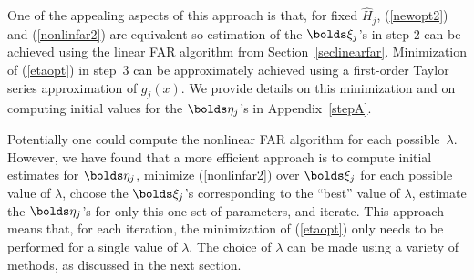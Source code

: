 \documentclass[aos,MSNbibl,dvips]{arximspdf}
\newcommand{\btheta}{\bolds\theta}
\newcommand{\bfeta}{\bolds\eta}
\newcommand{\bxi}{\bolds\xi}
\newcommand{\bh}{{\mathbf h}}
\newcommand{\hbfeta}{\hat{\bfeta}}
\newcommand{\hbxi}{\hat{\bxi}}
\begin{document}
One of the appealing aspects of this approach is that, for fixed $\widehat
H_j$, (\ref{newopt2}) and (\ref{nonlinfar2}) are equivalent so
estimation of the $\bxi_j$'s in step 2 can be achieved using the
linear FAR algorithm from Section~\ref{seclinearfar}. Minimization of
(\ref{etaopt}) in step~3 can be approximately achieved using a
first-order Taylor series approximation of $g_j(x)$. We provide details
on this minimization and on computing initial values for the $\bfeta
_j$'s in Appendix~\ref{stepA}.

Potentially one could compute the nonlinear FAR algorithm for each
possible~$\lambda$. However, we have found that a more efficient
approach is to compute initial estimates for $\bfeta_j$, minimize
(\ref{nonlinfar2}) over $\bxi_j$ for each possible value of $\lambda
$, choose the $\bxi_j$'s corresponding to the ``best'' value of
$\lambda$, estimate the $\bfeta_j$'s for only this one set of
parameters, and iterate. This approach means that, for each iteration,
the minimization of (\ref{etaopt}) only needs to be performed for a
single value of $\lambda$. The choice of $\lambda$ can be made using
a variety of methods, as discussed in the next section.

%
%
%

\end{document}
